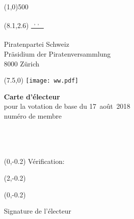 \documentclass[11pt, a4paper]{scrartcl}
\newcommand{\votingdate}{17~août~2018}
\begin{document}
{\begin{minipage}[t][13.42cm][t]{\textwidth}
\end{minipage}

\line(1,0){500}
\vspace{1cm}

\begin{minipage}[t][12.5cm][t]{\textwidth}

\begin{textblock}{9}(8.1,2.6)
\underline{\textsuperscript*{ \givenname~\surname, \street, \postalcode~\location }} \\
\vspace{-0.3cm} \\
Piratenpartei Schweiz \\
Präsidium der Piratenversammlung \\
8000 Zürich
\end{textblock}

\begin{textblock}{6}(7.5,0)
\texttt{[image: ww.pdf]}
\end{textblock}

{\LARGE\textbf{Carte d'électeur}} \\
pour la votation de base du \votingdate{} \\

numéro de membre \textbf{\id}   \\
\givenname~\surname         \\
\street                     \\
\postalcode~\location       \\
%

\begin{textblock}{6}(0,-0.2)
Vérification:
\end{textblock}

\begin{textblock}{4}(2,-0.2)
\raggedright
\code
\end{textblock}

\vspace{4cm}

\begin{textblock}{6}(0,-0.2)
\begin{framed}
Signature de l'électeur \\
\vspace{1.5cm} ~ \\
\end{framed}
\end{textblock}


\end{minipage}}
\end{document}
